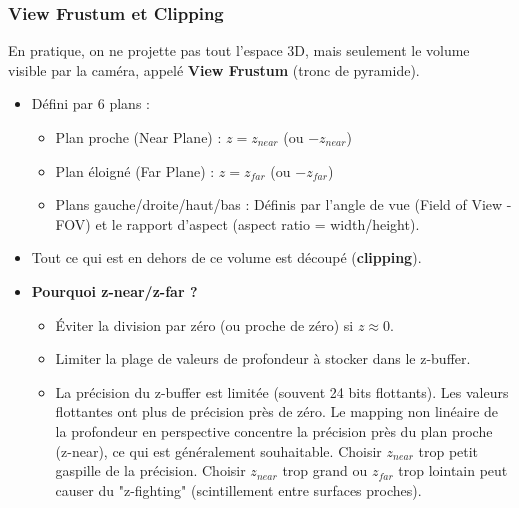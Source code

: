 \documentclass{article}
\begin{document}
\subsubsection{View Frustum et Clipping}
En pratique, on ne projette pas tout l'espace 3D, mais seulement le volume visible par la caméra, appelé \textbf{View Frustum} (tronc de pyramide).
\begin{itemize}
    \item Défini par 6 plans :
        \begin{itemize}
            \item Plan proche (Near Plane) : $z = z_{near}$ (ou $-z_{near}$)
            \item Plan éloigné (Far Plane) : $z = z_{far}$ (ou $-z_{far}$)
            \item Plans gauche/droite/haut/bas : Définis par l'angle de vue (Field of View - FOV) et le rapport d'aspect (aspect ratio = width/height).
        \end{itemize}
    \item Tout ce qui est en dehors de ce volume est découpé (\textbf{clipping}).
    \item \textbf{Pourquoi z-near/z-far ?}
        \begin{itemize}
            \item Éviter la division par zéro (ou proche de zéro) si $z \approx 0$.
            \item Limiter la plage de valeurs de profondeur à stocker dans le z-buffer.
            \item La précision du z-buffer est limitée (souvent 24 bits flottants). Les valeurs flottantes ont plus de précision près de zéro. Le mapping non linéaire de la profondeur en perspective concentre la précision près du plan proche (z-near), ce qui est généralement souhaitable. Choisir $z_{near}$ trop petit gaspille de la précision. Choisir $z_{near}$ trop grand ou $z_{far}$ trop lointain peut causer du "z-fighting" (scintillement entre surfaces proches).
        \end{itemize}
\end{itemize}
\end{document}

